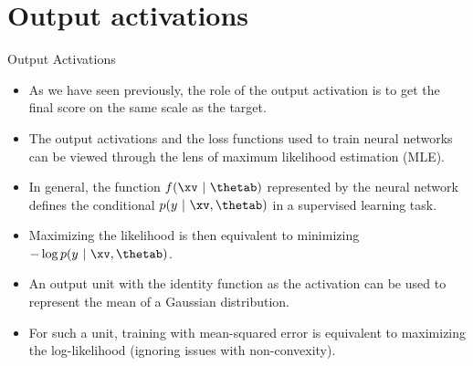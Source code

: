 
\section{Output activations}

\begin{frame} {Output Activations}
  \begin{itemize}
    \item As we have seen previously, the role of the output activation is to get the final score on the same scale as the target.
    \item The output activations and the loss functions used to train neural networks can be viewed through the lens of maximum likelihood estimation (MLE).
    \item In general, the function $f(\xv~|~\thetab)$ represented by the neural network defines the conditional $p(y~|~\xv,\thetab)$ in a supervised learning task.
    \item Maximizing the likelihood is then equivalent to minimizing $- \log p(y~|~\xv,\thetab)$.
    \item An output unit with the identity function as the activation can be used to represent the mean of a Gaussian distribution.
    \item For such a unit, training with mean-squared error is equivalent to maximizing the log-likelihood (ignoring issues with non-convexity).
  \end{itemize}
\end{frame}


